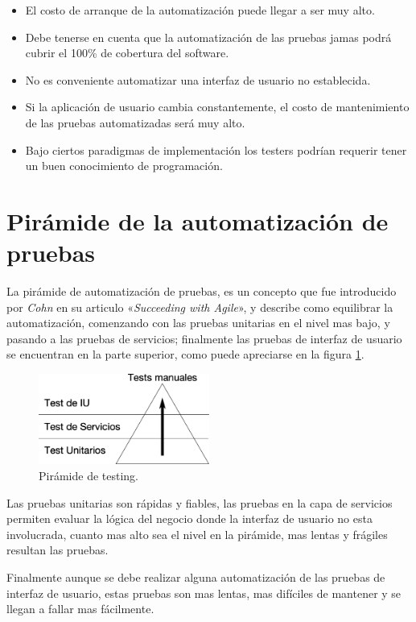 \begin{itemize}
    \item El costo de arranque de la automatización puede llegar a ser muy alto.
    \item Debe tenerse en cuenta que la automatización de las pruebas jamas
        podrá cubrir el 100\% de cobertura del software.
    \item No es conveniente automatizar una interfaz de usuario no establecida.
    \item Si la aplicación de usuario cambia constantemente, el costo de
        mantenimiento de las pruebas automatizadas será muy alto.
    \item Bajo ciertos paradigmas de implementación los testers podrían requerir
        tener un buen conocimiento de programación.
\end{itemize}

\section{Pirámide de la automatización de pruebas}
La pirámide de automatización de pruebas, es un concepto que fue introducido
por \emph{Cohn} en su articulo «\emph{Succeeding with Agile}», y describe como
equilibrar la automatización, comenzando con las pruebas unitarias en el nivel
mas bajo, y pasando a las pruebas de servicios; finalmente las pruebas de
interfaz de usuario se encuentran en la parte superior, como puede apreciarse en
la figura \ref{piramide}.

\begin{figure}
\centering
\includegraphics[width=0.5\textwidth]{graphics/pyramid.eps}
\caption{Pirámide de testing.}
\label{piramide}
\end{figure}

Las pruebas unitarias son rápidas y fiables, las pruebas en la capa de servicios
permiten evaluar la lógica del negocio donde la interfaz de usuario no esta
involucrada, cuanto mas alto sea el nivel en la pirámide, mas lentas y frágiles
resultan las pruebas.

Finalmente aunque se debe realizar alguna automatización de las pruebas de
interfaz de usuario, estas pruebas son mas lentas, mas difíciles de mantener y
se llegan a fallar mas fácilmente.

